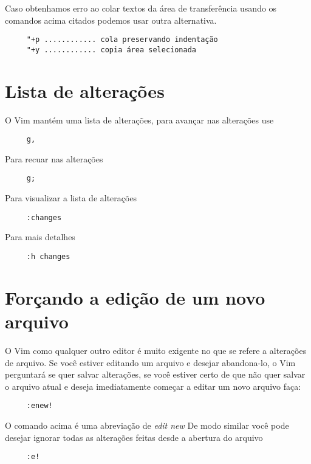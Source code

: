 Caso obtenhamos erro ao colar textos da área de transferência
usando os comandos acima citados podemos usar outra alternativa.

\begin{verbatim}
     "+p ............ cola preservando indentação
     "+y ............ copia área selecionada
\end{verbatim}

\section{Lista de alterações}
O Vim mantém uma lista de alterações, para avançar nas alterações use

\begin{verbatim}
     g,
\end{verbatim}

Para recuar nas alterações

\begin{verbatim}
     g;
\end{verbatim}

Para visualizar a lista de alterações

\begin{verbatim}
     :changes
\end{verbatim}

Para mais detalhes

\begin{verbatim}
     :h changes
\end{verbatim}


\section{Forçando a edição de um novo arquivo}\label{sec:Forçando a edição de um novo arquivo}

O Vim como qualquer outro editor é muito exigente no que se refere a alterações
de arquivo.  Se você estiver editando um arquivo e desejar abandona-lo, o Vim
perguntará se quer salvar alterações, se você estiver certo de que não quer
salvar o arquivo atual e deseja imediatamente começar a editar um novo arquivo
faça:

\begin{verbatim}
     :enew!
\end{verbatim}

O comando acima é uma abreviação de {\em edit new} De modo similar você pode
desejar ignorar todas as alterações feitas desde a abertura do arquivo

\begin{verbatim}
     :e!
\end{verbatim}


